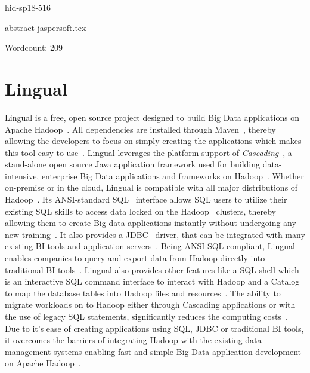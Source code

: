 \begin{IU}

hid-sp18-516

\href{https://github.com/cloudmesh-community/hid-sp18-516/blob/master//technology/abstract-jaspersoft.tex}{abstract-jaspersoft.tex}

 

Wordcount: 209

\end{IU}

\section{Lingual}

Lingual is a free, open source project designed to build Big Data applications
on Apache Hadoop~\cite{hid-sp18-516-www-drivenio-lingual}. All dependencies are
installed through Maven~\cite{hid-sp18-516-www-wiki-maven}, thereby allowing the 
developers to focus on simply creating the applications which makes this tool 
easy to use~\cite{hid-sp18-516-www-cascading}. Lingual leverages the platform 
support of \textit{Cascading}~\cite{hid-sp18-516-www-wiki-cascading}, a 
stand-alone open source Java application framework used for building 
data-intensive, enterprise Big Data applications and frameworks on 
Hadoop~\cite{hid-sp18-516-www-drivenio-lingual}. Whether on-premise or in the 
cloud, Lingual is compatible with all major distributions of 
Hadoop~\cite{hid-sp18-516-www-drivenio-lingual}. Its ANSI-standard 
SQL~\cite{hid-sp18-516-www-wiki-sql} interface allows SQL users to utilize 
their existing SQL skills to access data locked on the 
Hadoop~\cite{hid-sp18-516-www-wiki-hadoop} clusters, thereby allowing them 
to create Big data applications instantly without undergoing any new 
training~\cite{hid-sp18-516-www-drivenio-lingual}. It also provides a 
JDBC~\cite{hid-sp18-516-www-wiki-jdbc} driver, that can be integrated with many 
existing BI tools and application servers~\cite{hid-sp18-516-www-cascading}. 
Being ANSI-SQL compliant, Lingual enables companies to query and export data 
from Hadoop directly into traditional BI tools~\cite{hid-sp18-516-www-cascading}. 
Lingual also provides other features like a SQL shell which is an interactive 
SQL command interface to interact with Hadoop and a Catalog to map the database 
tables into Hadoop files and resources~\cite{hid-sp18-516-www-cascading}. The 
ability to migrate workloads on to Hadoop either through Cascading applications 
or with the use of legacy SQL statements, significantly reduces the computing
costs~\cite{hid-sp18-516-www-cascading}. Due to it's ease of creating
applications using SQL, JDBC or traditional BI tools, it overcomes the barriers
of integrating Hadoop with the existing data management systems enabling fast
and simple Big Data application development on Apache
Hadoop~\cite{hid-sp18-516-www-drivenio-lingual}.


